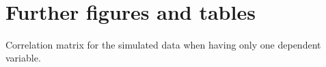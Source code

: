 \\



%





%

\section{Further figures and tables}
Correlation matrix for the simulated data when having only one dependent variable. 

